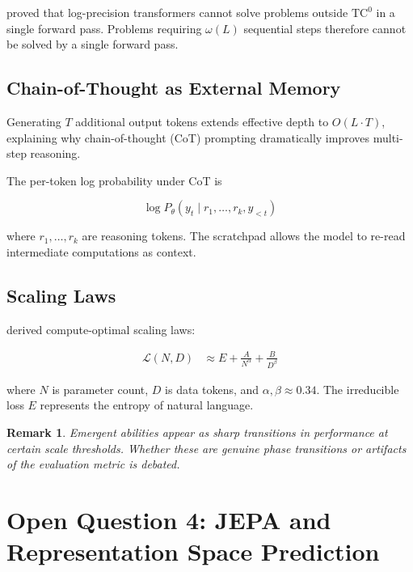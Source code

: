 \documentclass[10pt,twocolumn]{article}
\newtheorem{remark}{Remark}
\begin{document}
\noindent \citet{merrill2023parallelism} proved that log-precision
transformers cannot solve problems outside $\text{TC}^0$ in a single
forward pass.  Problems requiring $\omega(L)$ sequential steps therefore
cannot be solved by a single forward pass.

\subsection{Chain-of-Thought as External Memory}

Generating $T$ additional output tokens extends effective depth to
$O(L \cdot T)$, explaining why chain-of-thought (CoT) prompting
\citep{wei2022chain} dramatically improves multi-step reasoning.

The per-token log probability under CoT is

\begin{equation}
  \log P_\theta(y_t \mid r_1, \ldots, r_k, y_{<t})
  \label{eq:cot}
\end{equation}

\noindent where $r_1, \ldots, r_k$ are reasoning tokens.  The scratchpad
allows the model to re-read intermediate computations as context.

\subsection{Scaling Laws}

\citet{hoffmann2022chinchilla} derived compute-optimal scaling laws:

\begin{align}
  \mathcal{L}(N, D) &\approx E + \frac{A}{N^{\alpha}} + \frac{B}{D^{\beta}}
  \label{eq:scaling}
\end{align}

\noindent where $N$ is parameter count, $D$ is data tokens, and
$\alpha, \beta \approx 0.34$.  The irreducible loss $E$ represents the
entropy of natural language.

\begin{remark}
Emergent abilities \citep{wei2022emergent} appear as sharp transitions in
performance at certain scale thresholds.  Whether these are genuine
phase transitions or artifacts of the evaluation metric is debated.
\end{remark}

\section{Open Question 4: JEPA and Representation Space Prediction}
\label{sec:jepa}
\end{document}
